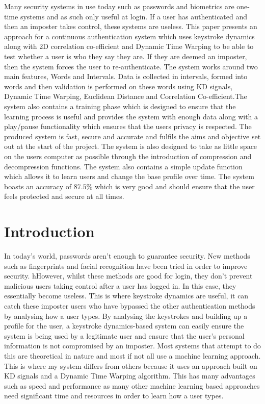 \documentclass[10pt,a4paper]{report}
\begin{document}
Many security systems in use today such as passwords and biometrics are one-time systems and as such only useful at login. If a user has authenticated and then an imposter takes control, these systems are useless. This paper presents an approach for a continuous authentication system which uses keystroke dynamics along with 2D correlation co-efficient and Dynamic Time Warping to be able to test whether a user is who they say they are. If they are deemed an imposter, then the system forces the user to re-authenticate. The system works around two main features, Words and Intervals. Data is collected in intervals, formed into words and then validation is performed on these words using KD signals, Dynamic Time Warping, Euclidean Distance and Correlation Co-efficient.The system also contains a training phase which is designed to ensure that the learning process is useful and provides the system with enough data along with a play/pause functionality which ensures that the users privacy is respected. The produced system is fast, secure and accurate and fulfils the aims and objective set out at the start of the project. The system is also designed to take as little space on the users computer as possible through the introduction of compression and decompression functions. The system also contains a simple update function which allows it to learn users and change the base profile over time. The system boasts an accuracy of \(87.5\%\) which is very good and should ensure that the user feels protected and secure at all times.

\tableofcontents

\chapter{Introduction}
\setcounter{page}{1}

In today's world, passwords aren't enough to guarantee security. New methods such as fingerprints and facial recognition have been tried in order to improve security. hHowever, whilst these methods are good for login, they don't prevent malicious users taking control after a user has logged in. In this case, they essentially become useless. This is where keystroke dynamics are useful, it can catch these imposter users who have bypassed the other authentication methods by analysing how a user types. By analysing the keystrokes and building up a profile for the user, a keystroke dynamics-based system can easily ensure the system is being used by a legitimate user and ensure that the user's personal information is not compromised by an imposter. Most systems that attempt to do this are theoretical in nature and most if not all use a machine learning approach. This is where my system differs from others because it uses an approach built on KD signals and a Dynamic Time Warping algorithm. This has many advantages such as speed and performance as many other machine learning based approaches need significant time and resources in order to learn how a user types.
\end{document}
